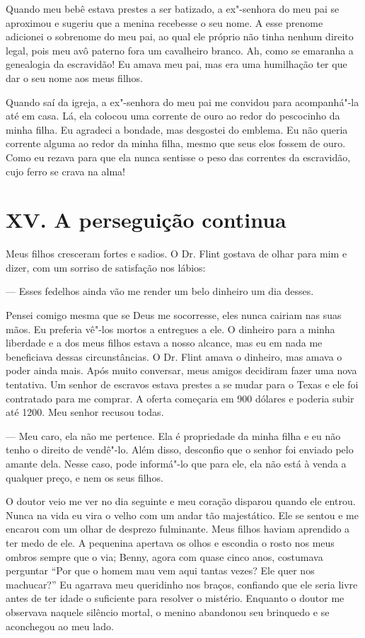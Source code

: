 Quando meu bebê estava prestes a ser
batizado, a ex"-senhora do meu pai se aproximou e sugeriu que a menina
recebesse o seu nome. A esse prenome adicionei o sobrenome do meu pai,
ao qual ele próprio não tinha nenhum direito legal, pois meu avô paterno
fora um cavalheiro branco. Ah, como se emaranha a genealogia da
escravidão! Eu amava meu pai, mas era uma humilhação ter que dar o seu
nome aos meus filhos.

Quando saí da igreja, a ex"-senhora do
meu pai me convidou para acompanhá"-la até em casa. Lá, ela colocou uma
corrente de ouro ao redor do pescocinho da minha filha. Eu agradeci a
bondade, mas desgostei do emblema. Eu não queria corrente alguma ao
redor da minha filha, mesmo que seus elos fossem de ouro. Como eu rezava
para que ela nunca sentisse o peso das correntes da escravidão, cujo
ferro se crava na alma!

\chapter{XV. A perseguição
continua}

Meus filhos cresceram fortes e sadios.
O Dr. Flint gostava de olhar para mim e dizer, com um sorriso de
satisfação nos lábios:

--- Esses fedelhos ainda vão me render um belo dinheiro um dia desses.

Pensei comigo mesma que se Deus me
socorresse, eles nunca cairiam nas suas mãos. Eu preferia vê"-los mortos
a entregues a ele. O dinheiro para a minha liberdade e a dos meus filhos
estava a nosso alcance, mas eu em nada me beneficiava dessas
circunstâncias. O Dr. Flint amava o dinheiro, mas amava o poder ainda
mais. Após muito conversar, meus amigos decidiram fazer uma nova
tentativa. Um senhor de escravos estava prestes a se mudar para o Texas
e ele foi contratado para me comprar. A oferta começaria em 900 dólares
e poderia subir até 1200. Meu senhor recusou todas.

--- Meu caro, ela não me pertence. Ela é propriedade da minha filha e eu
não tenho o direito de vendê"-lo. Além disso, desconfio que o senhor foi
enviado pelo amante dela. Nesse caso, pode informá"-lo que para ele, ela
não está à venda a qualquer preço, e nem os seus filhos.

O doutor veio me ver no dia seguinte e
meu coração disparou quando ele entrou. Nunca na vida eu vira o velho
com um andar tão majestático. Ele se sentou e me encarou com um olhar de
desprezo fulminante. Meus filhos haviam aprendido a ter medo de ele. A
pequenina apertava os olhos e escondia o rosto nos meus ombros sempre
que o via; Benny, agora com quase cinco anos, costumava perguntar ``Por
que o homem mau vem aqui tantas vezes? Ele quer nos machucar?'' Eu
agarrava meu queridinho nos braços, confiando que ele seria livre antes
de ter idade o suficiente para resolver o mistério. Enquanto o doutor me
observava naquele silêncio mortal, o menino abandonou seu brinquedo e se
aconchegou ao meu lado.

